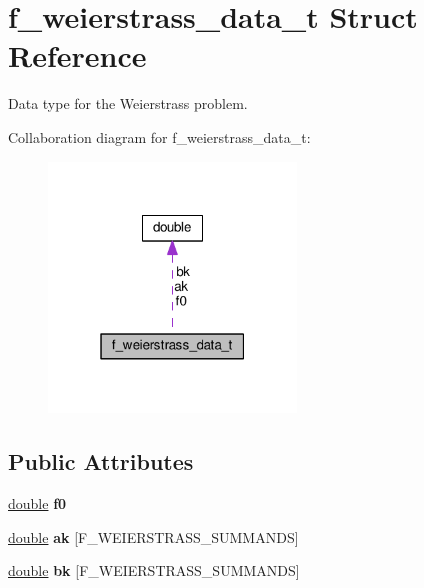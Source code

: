 \hypertarget{structf__weierstrass__data__t}{}\section{f\+\_\+weierstrass\+\_\+data\+\_\+t Struct Reference}
\label{structf__weierstrass__data__t}


Data type for the Weierstrass problem.  




Collaboration diagram for f\+\_\+weierstrass\+\_\+data\+\_\+t\+:\nopagebreak
\begin{figure}[H]
\begin{center}
\leavevmode
\includegraphics[width=187pt]{structf__weierstrass__data__t__coll__graph}
\end{center}
\end{figure}
\subsection*{Public Attributes}
\begin{DoxyCompactItemize}
\item 
\hyperlink{classdouble}{double} {\bfseries f0}\hypertarget{structf__weierstrass__data__t_a46e2be4d5873c3c21604794fb1588fa5}{}\label{structf__weierstrass__data__t_a46e2be4d5873c3c21604794fb1588fa5}

\item 
\hyperlink{classdouble}{double} {\bfseries ak} \mbox{[}F\+\_\+\+W\+E\+I\+E\+R\+S\+T\+R\+A\+S\+S\+\_\+\+S\+U\+M\+M\+A\+N\+DS\mbox{]}\hypertarget{structf__weierstrass__data__t_a0435b30e51cdbe92232b6af1ea88c046}{}\label{structf__weierstrass__data__t_a0435b30e51cdbe92232b6af1ea88c046}

\item 
\hyperlink{classdouble}{double} {\bfseries bk} \mbox{[}F\+\_\+\+W\+E\+I\+E\+R\+S\+T\+R\+A\+S\+S\+\_\+\+S\+U\+M\+M\+A\+N\+DS\mbox{]}\hypertarget{structf__weierstrass__data__t_adf2f42c57a3478ad78d971282b80971a}{}\label{structf__weierstrass__data__t_adf2f42c57a3478ad78d971282b80971a}

\end{DoxyCompactItemize}


